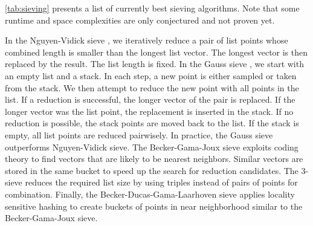 \cref{tab:sieving} presents a list of currently best sieving algorithms. Note that some runtime and space complexities are only conjectured and not proven yet.

In the Nguyen-Vidick sieve \cite{NV08}, we iteratively reduce a pair of list points whose combined length is smaller than the longest list vector. The longest vector is then replaced by the result. The list length is fixed.
In the Gauss sieve \cite{MV10}, we start with an empty list and a stack. In each step, a new point is either sampled or taken from the stack. We then attempt to reduce the new point with all points in the list. If a reduction is successful, the longer vector of the pair is replaced. If the longer vector was the list point, the replacement is inserted in the stack. If no reduction is possible, the stack points are moved back to the list. If the stack is empty, all list points are reduced pairwisely. In practice, the Gauss sieve outperforms Nguyen-Vidick sieve.
The Becker-Gama-Joux sieve \cite{BGJ15} exploits coding theory to find vectors that are likely to be nearest neighbors. Similar vectors are stored in the same bucket to speed up the search for reduction candidates.
The 3-sieve \cite{BLS16, HK17} reduces the required list size by using triples instead of pairs of points for combination.
Finally, the Becker-Ducas-Gama-Laarhoven sieve \cite{BDGL16} applies locality sensitive hashing to create buckets of points in near neighborhood similar to the Becker-Gama-Joux sieve. %

















